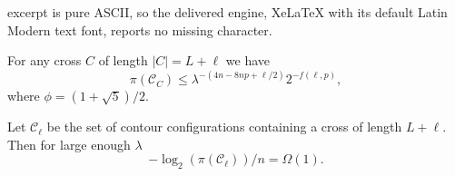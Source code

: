 \documentclass[10pt,a4paper]{amsart}
\newcommand{\cC}{\mathcal{C}}
\begin{document}
excerpt is pure ASCII, so the delivered engine, XeLaTeX with its default Latin Modern text font, reports no missing character.
\begin{lemma}\label{lem:piOmegaC}
For any cross $C$ of length $|C| = L + \ell$   we have
\begin{equation*}
\pi(\cC_C ) \leq  \lambda^{-(4n-8np+\ell/2)} 2^{-f(\ell, p)},
\end{equation*}
where 
$\phi = {(1+\sqrt{5})}/{2}$.
\end{lemma}

\begin{lemma}\label{lem:piOmegaL1}
Let $\cC_{\ell}$ be the set of contour configurations containing a cross of length $L + \ell$. 
Then for large enough $\lambda$ 
\begin{equation}\label{eqn:piOmega0L}
- \log_2(\pi(\cC_{\ell}))/n = \Omega(1).
\end{equation}
\end{lemma}
\end{document}
